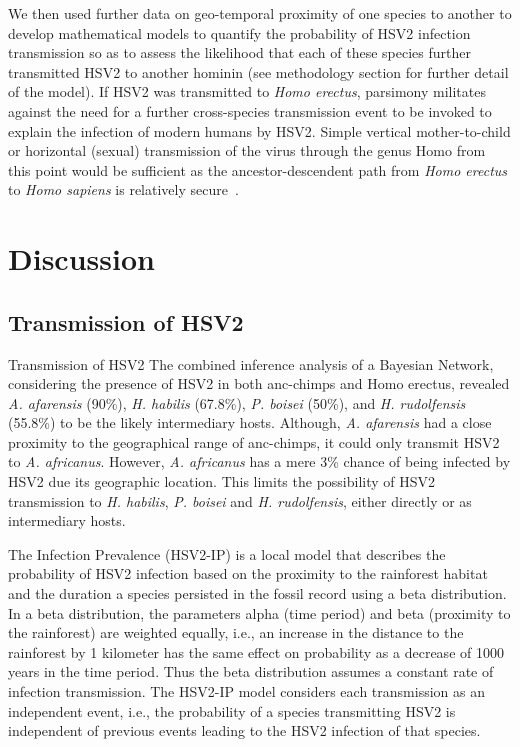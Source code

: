 \documentclass[fleqn,10pt]{wlscirep}
\begin{document}
We then used further data on geo-temporal proximity of one species to another to develop mathematical models to quantify the probability of HSV2 infection transmission so as to assess the likelihood that each of these species further transmitted HSV2 to another hominin (see methodology section for further detail of the model). If HSV2 was transmitted to \textit{Homo erectus}, parsimony militates against the need for a further cross-species transmission event to be invoked to explain the infection of modern humans by HSV2. Simple vertical mother-to-child or horizontal (sexual) transmission of the virus through the genus Homo from this point would be sufficient as the ancestor-descendent path from \textit{Homo erectus} to \textit{Homo sapiens} is relatively secure~\citep{Maslin2015}.

\section*{Discussion}
\subsection*{Transmission of HSV2}
Transmission of HSV2
The combined inference analysis of a Bayesian Network, considering the presence of HSV2 in both anc-chimps and Homo erectus, revealed \textit{A. afarensis} (90\%), \textit{H. habilis} (67.8\%), \textit{P. boisei}  (50\%), and \textit{H. rudolfensis} (55.8\%) to be the likely intermediary hosts. Although, \textit{A. afarensis} had a close proximity to the geographical range of anc-chimps, it could only transmit HSV2 to \textit{A. africanus}. However, \textit{A. africanus} has a mere 3\% chance of being infected by HSV2 due its geographic location. This limits the possibility of HSV2 transmission to \textit{H. habilis}, \textit{P. boisei} and \textit{H. rudolfensis}, either directly or as intermediary hosts. 

The Infection Prevalence (HSV2-IP) is a local model that describes the probability of HSV2 infection based on the proximity to the rainforest habitat and the duration a species persisted in the fossil record using a beta distribution. In a beta distribution, the parameters alpha (time period) and beta (proximity to the rainforest) are weighted equally, i.e., an increase in the distance to the rainforest by 1 kilometer has the same effect on probability as a decrease of 1000 years in the time period. Thus the beta distribution assumes a constant rate of infection transmission. The HSV2-IP model considers each transmission as an independent event, i.e., the probability of a species transmitting HSV2 is independent of previous events leading to the HSV2 infection of that species. 
\end{document}
